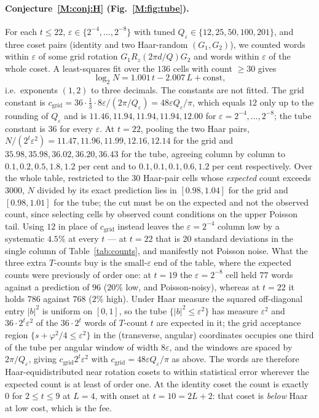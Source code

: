 \documentclass[aps,prx,twocolumn,superscriptaddress,nofootinbib,longbibliography]{revtex4-2}
\theoremstyle{plain}
\theoremstyle{definition}
\theoremstyle{remark}
\begin{document}
\paragraph{Conjecture~\ref{M:conj:H} (Fig.~\ref{M:fig:tube}).} For each $t\le22$, $\varepsilon\in\{2^{-4},\dots,2^{-8}\}$ with tuned $Q_\varepsilon\in\{12,25,50,100,201\}$, and three coset pairs (identity and two Haar-random $(G_1,G_2)$), we counted words within $\varepsilon$ of some grid rotation $G_1R_z(2\pi d/Q)G_2$ and words within $\varepsilon$ of the whole coset. A least-squares fit over the $136$ cells with count $\ge30$ gives
\begin{equation}
\log_2N=1.001\,t-2.007\,L+\text{const},
\end{equation}
i.e.\ exponents $(1,2)$ to three decimals. The constants are not fitted. The grid constant is $c_{\mathrm{grid}}=36\cdot\tfrac13\cdot8\varepsilon/(2\pi/Q_\varepsilon)=48\varepsilon Q_\varepsilon/\pi$, which equals $12$ only up to the rounding of $Q_\varepsilon$ and is $11.46,11.94,11.94,11.94,12.00$ for $\varepsilon=2^{-4},\dots,2^{-8}$; the tube constant is $36$ for every $\varepsilon$. At $t=22$, pooling the two Haar pairs, $N/(2^t\varepsilon^2)=11.47,11.96,11.99,12.16,12.14$ for the grid and $35.98,35.98,36.02,36.20,36.43$ for the tube, agreeing column by column to $0.1,0.2,0.5,1.8,1.2$ per cent and to $0.1,0.1,0.1,0.6,1.2$ per cent respectively. Over the whole table, restricted to the $30$ Haar-pair cells whose \emph{expected} count exceeds $3000$, $N$ divided by its exact prediction lies in $[0.98,1.04]$ for the grid and $[0.98,1.01]$ for the tube; the cut must be on the expected and not the observed count, since selecting cells by observed count conditions on the upper Poisson tail. Using $12$ in place of $c_{\mathrm{grid}}$ instead leaves the $\varepsilon=2^{-4}$ column low by a systematic $4.5\%$ at every $t$ --- at $t=22$ that is $20$ standard deviations in the single column of Table~\ref{tab:counts}, and manifestly not Poisson noise. What the three extra $T$-counts buy is the small-$\varepsilon$ end of the table, where the expected counts were previously of order one: at $t=19$ the $\varepsilon=2^{-8}$ cell held $77$ words against a prediction of $96$ ($20\%$ low, and Poisson-noisy), whereas at $t=22$ it holds $786$ against $768$ ($2\%$ high). Under Haar measure the squared off-diagonal entry $|b|^2$ is uniform on $[0,1]$, so the tube $\{|b|^2\le\varepsilon^2\}$ has measure $\varepsilon^2$ and $36\cdot2^t\varepsilon^2$ of the $36\cdot2^t$ words of $T$-count $t$ are expected in it; the grid acceptance region $\{s+\varphi^2/4\le\varepsilon^2\}$ in the (transverse, angular) coordinates occupies one third of the tube per angular window of width $8\varepsilon$, and the windows are spaced by $2\pi/Q_\varepsilon$, giving $c_{\mathrm{grid}}2^t\varepsilon^2$ with $c_{\mathrm{grid}}=48\varepsilon Q_\varepsilon/\pi$ as above. The words are therefore Haar-equidistributed near rotation cosets to within statistical error wherever the expected count is at least of order one. At the identity coset the count is exactly $0$ for $2\le t\le9$ at $L=4$, with onset at $t=10=2L+2$: that coset is \emph{below} Haar at low cost, which is the fee.
\end{document}
